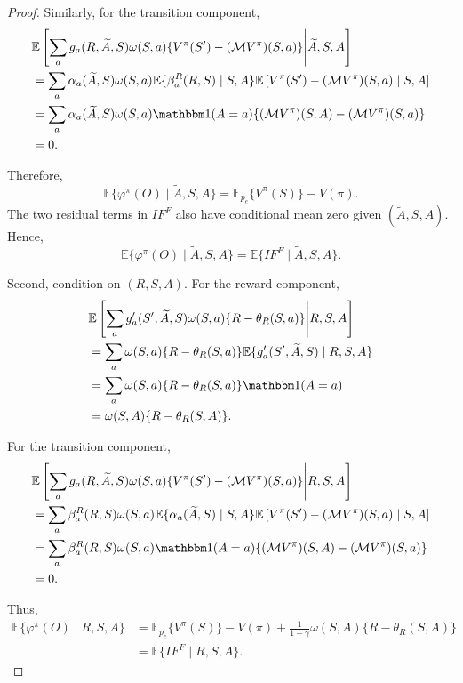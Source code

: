 \documentclass[12pt]{article}
\newcommand{\0}{\boldsymbol{0}}
\begin{document}
\begin{proof}
Similarly, for the transition component,
\[
\begin{aligned}
&\mathbb E\left[\sum_ag_a(R,\widetilde A,S)\omega(S,a)\{V^\pi(S')-(\mathcal M V^\pi)(S,a)\}\middle|\widetilde A,S,A\right] \\
&=\sum_a\alpha_a(\widetilde A,S)\omega(S,a)\mathbb E\{\beta_a^R(R,S)\mid S,A\} 
\mathbb E\left[V^\pi(S')-(\mathcal M V^\pi)(S,a)\mid S,A\right] \\
&=\sum_a\alpha_a(\widetilde A,S)\omega(S,a)\mathbbm 1(A=a)\{(\mathcal M V^\pi)(S,A)-(\mathcal M V^\pi)(S,a)\} \\
&=0.
\end{aligned}
\]

Therefore,
\[
\mathbb E\{\varphi^\pi(O)\mid \widetilde A,S,A\}=\mathbb E_{p_e}\{V^\pi(S)\}-V(\pi).
\]
The two residual terms in $IF^F$ also have conditional mean zero given $(\widetilde A,S,A)$. Hence,
\[
\mathbb E\{\varphi^\pi(O)\mid \widetilde A,S,A\}=\mathbb E\{IF^F\mid \widetilde A,S,A\}.
\]

Second, condition on $(R,S,A)$. For the reward component,
\[
\begin{aligned}
&\mathbb E\left[\sum_ag_a'(S',\widetilde A,S)\omega(S,a)\{R-\theta_R(S,a)\}\middle|R,S,A\right] \\
&=\sum_a\omega(S,a)\{R-\theta_R(S,a)\}\mathbb E\{g_a'(S',\widetilde A,S)\mid R,S,A\} \\
&=\sum_a\omega(S,a)\{R-\theta_R(S,a)\}\mathbbm 1(A=a) \\
&=\omega(S,A)\{R-\theta_R(S,A)\}.
\end{aligned}
\]

For the transition component,
\[
\begin{aligned}
&\mathbb E\left[\sum_ag_a(R,\widetilde A,S)\omega(S,a)\{V^\pi(S')-(\mathcal M V^\pi)(S,a)\}
\middle|R,S,A\right] \\
&=\sum_a\beta_a^R(R,S)\omega(S,a)
\mathbb E\{\alpha_a(\widetilde A,S)\mid S,A\} 
\mathbb E\left[V^\pi(S')-(\mathcal M V^\pi)(S,a)\mid S,A\right] \\
&=\sum_a\beta_a^R(R,S)\omega(S,a)\mathbbm 1(A=a)\{(\mathcal M V^\pi)(S,A)-(\mathcal M V^\pi)(S,a)\} \\
&=0.
\end{aligned}
\]

Thus,
\[
\begin{aligned}
\mathbb E\{\varphi^\pi(O)\mid R,S,A\}
&=\mathbb E_{p_e}\{V^\pi(S)\}-V(\pi) +\frac{1}{1-\gamma}\omega(S,A)\{R-\theta_R(S,A)\} \\
&=\mathbb E\{IF^F\mid R,S,A\}.
\end{aligned}
\]


\end{proof}
\end{document}
